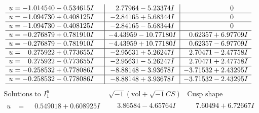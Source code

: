 \documentclass[1p]{elsarticle_modified}
\theoremstyle{definition}
\newcommand{\I}{\sqrt{-1}}
\begin{document}
$$\begin{array}{c|c|c}
\begin{aligned}
u &= -1.014540 - 0.534615 I\end{aligned}
 & \phantom{-}2.77964 - 5.23374 I & \phantom{-0.000000 } 0 \\ \hline\begin{aligned}
u &= -1.094730 + 0.408125 I\end{aligned}
 & -2.84165 + 5.68344 I & \phantom{-0.000000 } 0 \\ \hline\begin{aligned}
u &= -1.094730 - 0.408125 I\end{aligned}
 & -2.84165 - 5.68344 I & \phantom{-0.000000 } 0 \\ \hline\begin{aligned}
u &= -0.276879 + 0.781910 I\end{aligned}
 & -4.43959 - 10.77180 I & \phantom{-}0.62357 + 6.97709 I \\ \hline\begin{aligned}
u &= -0.276879 - 0.781910 I\end{aligned}
 & -4.43959 + 10.77180 I & \phantom{-}0.62357 - 6.97709 I \\ \hline\begin{aligned}
u &= \phantom{-}0.275922 + 0.773655 I\end{aligned}
 & -2.95631 + 5.26247 I & \phantom{-}2.70471 - 2.47758 I \\ \hline\begin{aligned}
u &= \phantom{-}0.275922 - 0.773655 I\end{aligned}
 & -2.95631 - 5.26247 I & \phantom{-}2.70471 + 2.47758 I \\ \hline\begin{aligned}
u &= -0.258532 + 0.778086 I\end{aligned}
 & -8.88148 - 3.93678 I & -3.71532 + 2.43295 I \\ \hline\begin{aligned}
u &= -0.258532 - 0.778086 I\end{aligned}
 & -8.88148 + 3.93678 I & -3.71532 - 2.43295 I\\
 \hline 
 \end{array}$$\newpage$$\begin{array}{c|c|c}  
\text{Solutions to }I^u_{1}& \I (\text{vol} + \sqrt{-1}CS) & \text{Cusp shape}\\
 \hline 
\begin{aligned}
u &= \phantom{-}0.549018 + 0.608925 I\end{aligned}
 & \phantom{-}3.86584 - 4.65764 I & \phantom{-}7.60494 + 6.72667 I \\ \hline\begin{aligned}

\end{aligned}
\end{array}$$
\end{document}

